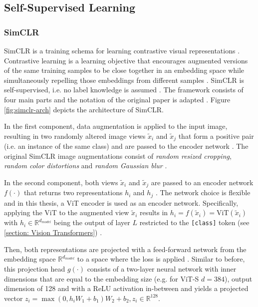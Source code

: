 \subsection{Self-Supervised Learning}
\label{section: SSL}
\subsubsection{SimCLR}
\label{section: SimCLR}
SimCLR is a training schema for learning contrastive visual representations \citep{Chen2020}.
Contrastive learning is a learning objective that encourages augmented versions of the same training samples to be close together in an embedding space while simultaneously repelling those embeddings from different samples \citep{Jaiswal2020}.
SimCLR is self-supervised, i.e. no label knowledge is assumed \citep{Chen2020}.
The framework consists of four main parts and the notation of the original paper is adapted \citep{Chen2020}.
Figure \ref{fig:simclr-arch} depicts the architecture of SimCLR.
\par
In the first component, data augmentation is applied to the input image, resulting in two randomly altered image views $\tilde{x}_i$ and $\tilde{x}_j$ that form a positive pair (i.e. an instance of the same class) and are passed to the encoder network \citep{Chen2020}.
The original SimCLR image augmentations consist of \textit{random resized cropping}, \textit{random color distortions} and \textit{random Gaussian blur} \citep{Chen2020}.
\par
In the second component, both views $\tilde{x}_i$ and $\tilde{x}_j$ are passed to an encoder network $f(\cdot)$ that returns two representations $h_i$ and $h_j$ \citep{Chen2020}.
The network choice is flexible and in this thesis, a ViT encoder is used as an encoder network.
Specifically, applying the ViT to the augmented view $\tilde{x}_i$ results in $h_i = f(\tilde{x}_i) = \text{ViT}(\tilde{x}_i)$ with $h_i \in \mathbb{R}^{d_{model}}$ being the output of layer $L$ restricted to the \texttt{[class]} token (see \ref{section: Vision Transformers}) \citep{Chen2020}.
\par
Then, both representations are projected with a feed-forward network from the embedding space $\mathbb{R}^{d_{model}}$ to a space where the loss is applied \citep{Chen2020}.
Similar to before, this projection head $g(\cdot)$ consists of a two-layer neural network with inner dimensions that are equal to the embedding size (e.g. for ViT-S $d=384$), output dimension of 128 and with a ReLU activation in-between \citep{Chen2020} and yields a projected vector $z_i = \max(0, h_iW_1 + b_1)W_2+b_2, z_i \in \mathbb{R}^{128}$.
